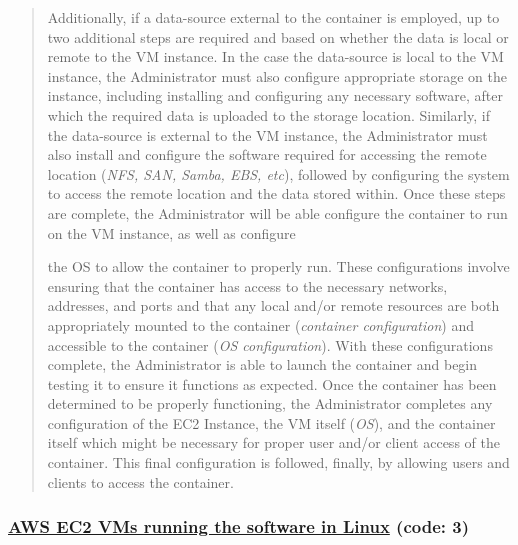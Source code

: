\begin{quote}
\begin{itemize}
Additionally, if a data-source external to the container is employed, up to two additional steps are required and based on whether the data is local or remote to the VM instance.  In the case the data-source is local to the VM instance, the Administrator must also configure appropriate storage on the instance, including installing and configuring any necessary software, after which the required data is uploaded to the storage location.  Similarly, if the data-source is external to the VM instance, the Administrator must also install and configure the software required for accessing the remote location (\emph{NFS, SAN, Samba, EBS, etc}), followed by configuring the system to access the remote location and the data stored within.  Once these steps are complete, the Administrator will be able configure the container to run on the VM instance, as well as configure 

the OS to allow the container to properly run.  These configurations involve ensuring that the container has access to the necessary networks, addresses, and ports and that any local and/or remote resources are both appropriately mounted to the container (\emph{container configuration}) and accessible to the container (\emph{OS configuration}).  With these configurations complete, the Administrator is able to launch the container and begin testing it to ensure it functions as expected.  Once the container has been determined to be properly functioning, the Administrator completes any configuration of the EC2 Instance, the VM itself (\emph{OS}), and the container itself which might be necessary for proper user and/or client access of the container.  This final configuration is followed, finally, by allowing users and clients to access the container.
\end{itemize}
\end{quote}


\subsubsection{\underline{AWS EC2 VMs running the software in Linux} (code: \textbf{3})}

